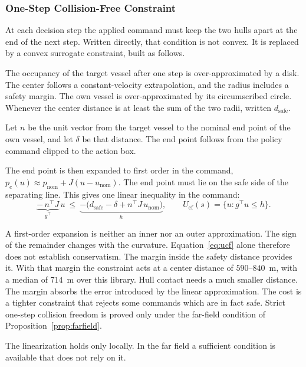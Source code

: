 \documentclass[10pt,letterpaper]{article}
\begin{document}
\subsubsection{One-Step Collision-Free Constraint}
\label{sec:collfree}

At each decision step the applied command must keep the two hulls apart at the end of the
next step. Written directly, that condition is not convex. It is replaced by a convex surrogate
constraint, built as follows.

The occupancy of the target vessel after one step is over-approximated by a disk.
The center follows a constant-velocity extrapolation, and the radius includes a safety margin. The own vessel is over-approximated by its circumscribed circle. Whenever the center
distance is at least the sum of the two radii, written $d_{\mathrm{safe}}$.

Let $n$ be the unit vector from the target vessel to the nominal end point of the own
vessel, and let $\delta$ be that distance. The end point follows from the policy command clipped to the action box.

The end point is then expanded to first order in the command,
$p_e(u)\approx p_{\mathrm{nom}}+J(u-u_{\mathrm{nom}})$. The end point must lie on the safe side of the separating line. This gives one linear inequality in the command:
\begin{equation}
 \underbrace{-\,n^{\!\top}\!J}_{\textstyle g^{\!\top}}\,u\ \le\
 \underbrace{-\bigl(d_{\mathrm{safe}}-\delta+n^{\!\top}\!J\,u_{\mathrm{nom}}\bigr)}_{\textstyle h},
 \qquad U_{\mathrm{cf}}(s)=\{u: g^{\!\top}u\le h\}.
 \label{eq:ucf}
\end{equation}

A first-order expansion is neither an inner nor an outer approximation. The sign of the
remainder changes with the curvature. Equation~\eqref{eq:ucf} alone therefore does not establish conservatism. The margin
inside the safety distance provides it. With that margin the constraint acts at a center distance of $590$--$840$~m, with a
median of $714$~m over this library. Hull contact needs a much smaller distance. The margin absorbs the error introduced by the
linear approximation. The cost is a tighter constraint that rejects some commands which
are in fact safe. Strict one-step collision freedom is proved only under the far-field
condition of Proposition~\ref{prop:farfield}.

The linearization holds only locally. In the far field a sufficient condition is available that does not rely on it.
\end{document}
